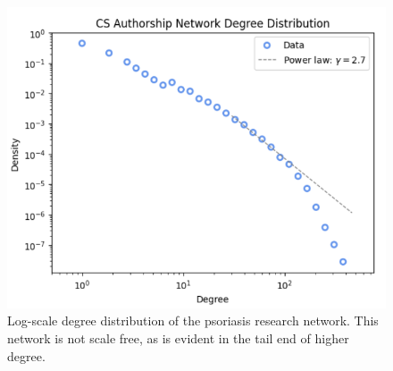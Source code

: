 \documentclass[9pt,twocolumn,twoside]{pnas-new}
\begin{document}
\begin{figure}[H]
    \centering
        \includegraphics[width=0.32\textheight]{powerlawCS.png}
    \caption{Log-scale degree distribution of the psoriasis research network. This network is not scale free, as is evident in the tail end of higher degree.}
    \label{fig:powerlawCS}
\end{figure}
\renewcommand{\arraystretch}{0.75}
\end{document}
